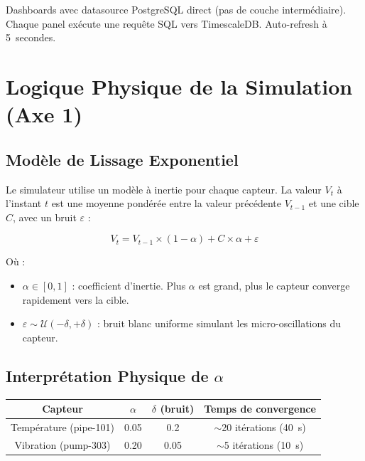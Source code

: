 \documentclass[11pt,a4paper]{article}
\begin{document}
Dashboards avec datasource PostgreSQL direct (pas de couche intermédiaire). Chaque panel exécute une requête SQL vers TimescaleDB. Auto-refresh à 5~secondes.

\newpage

\section{Logique Physique de la Simulation (Axe 1)}

\subsection{Modèle de Lissage Exponentiel}

Le simulateur utilise un modèle à inertie pour chaque capteur. La valeur $V_t$ à l'instant $t$ est une moyenne pondérée entre la valeur précédente $V_{t-1}$ et une cible $C$, avec un bruit $\varepsilon$ :

\[
\boxed{V_t = V_{t-1} \times (1 - \alpha) + C \times \alpha + \varepsilon}
\]

Où :
\begin{itemize}
    \item $\alpha \in [0, 1]$ : coefficient d'inertie. Plus $\alpha$ est grand, plus le capteur converge rapidement vers la cible.
    \item $\varepsilon \sim \mathcal{U}(-\delta, +\delta)$ : bruit blanc uniforme simulant les micro-oscillations du capteur.
\end{itemize}

\subsection{Interprétation Physique de $\alpha$}

\begin{center}
\begin{tabular}{|c|c|c|c|}
\hline
\textbf{Capteur} & $\alpha$ & $\delta$ (bruit) & \textbf{Temps de convergence} \\
\hline
Température (pipe-101) & 0.05 & 0.2 & $\sim$20 itérations (40~s) \\
Vibration (pump-303) & 0.20 & 0.05 & $\sim$5 itérations (10~s) \\
\hline
\end{tabular}
\end{center}
\end{document}

